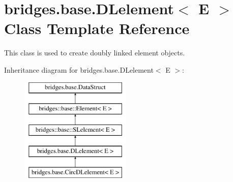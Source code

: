 \hypertarget{classbridges_1_1base_1_1_d_lelement}{}\section{bridges.\+base.\+D\+Lelement$<$ E $>$ Class Template Reference}
\label{classbridges_1_1base_1_1_d_lelement}


This class is used to create doubly linked element objects.  


Inheritance diagram for bridges.\+base.\+D\+Lelement$<$ E $>$\+:\begin{figure}[H]
\begin{center}
\leavevmode
\includegraphics[height=5.000000cm]{classbridges_1_1base_1_1_d_lelement}
\end{center}
\end{figure}

